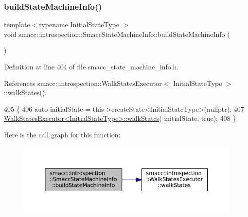 \mbox{\label{classsmacc_1_1introspection_1_1SmaccStateMachineInfo_a1482f3d6b3aff8a2702331bd3049987a}} 
\subsubsection{\texorpdfstring{build\+State\+Machine\+Info()}{buildStateMachineInfo()}}
{\footnotesize\ttfamily template$<$typename Initial\+State\+Type $>$ \\
void smacc\+::introspection\+::\+Smacc\+State\+Machine\+Info\+::build\+State\+Machine\+Info (\begin{DoxyParamCaption}{ }\end{DoxyParamCaption})}



Definition at line 404 of file smacc\+\_\+state\+\_\+machine\+\_\+info.\+h.



References smacc\+::introspection\+::\+Walk\+States\+Executor$<$ Initial\+State\+Type $>$\+::walk\+States().


\begin{DoxyCode}
405 \{
406     \textcolor{keyword}{auto} initialState = this->createState<InitialStateType>(\textcolor{keyword}{nullptr});
407     \hyperlink{structsmacc_1_1introspection_1_1WalkStatesExecutor_a21848ccc6e7a7ddee0ccfff97e550ec6}{WalkStatesExecutor<InitialStateType>::walkStates}(
      initialState, \textcolor{keyword}{true});
408 \}
\end{DoxyCode}
Here is the call graph for this function\+:
\nopagebreak
\begin{figure}[H]
\begin{center}
\leavevmode
\includegraphics[width=350pt]{classsmacc_1_1introspection_1_1SmaccStateMachineInfo_a1482f3d6b3aff8a2702331bd3049987a_cgraph}
\end{center}
\end{figure}
\mbox{\label{classsmacc_1_1introspection_1_1SmaccStateMachineInfo_aa120497a9fc4cb4a05f6a27ff3be26cb}} 
